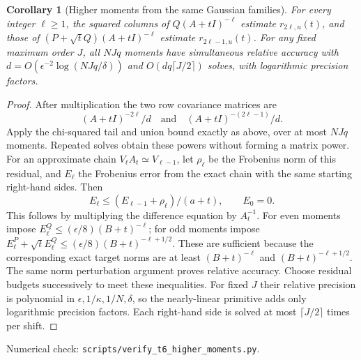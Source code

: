 \documentclass[11pt]{article}
\newtheorem{corollary}[theorem]{Corollary}
\begin{document}
\begin{corollary}[Higher moments from the same Gaussian families]\label{cor:higherjl}
For every integer $\ell\geq1$, the squared columns of
$Q(A+tI)^{-\ell}$ estimate $r_{2\ell,u}(t)$, and those of
$(P+\sqrt tQ)(A+tI)^{-\ell}$ estimate $r_{2\ell-1,u}(t)$.
For any fixed maximum order $J$, all $NJq$ moments have simultaneous
relative accuracy with $d=O(\epsilon^{-2}\log(NJq/\delta))$ and
$O(dq\lceil J/2\rceil)$ solves, with logarithmic precision factors.
\end{corollary}
\begin{proof}
After multiplication the two row covariance matrices are
\[
 (A+tI)^{-2\ell}/d\quad\text{and}\quad(A+tI)^{-(2\ell-1)}/d.
\]
Apply the chi-squared tail and union bound exactly as above, over
at most $NJq$ moments. Repeated solves obtain these powers without
forming a matrix power. For an approximate chain
$V_\ell A_t\simeq V_{\ell-1}$, let $\rho_\ell$ be the Frobenius
norm of this residual, and $E_\ell$ the Frobenius error from the
exact chain with the same starting right-hand sides. Then
\[
 E_\ell\leq(E_{\ell-1}+\rho_\ell)/(a+t),\qquad E_0=0.
\]
This follows by multiplying the difference equation by $A_t^{-1}$.
For even moments impose $E^Q_\ell\leq(\epsilon/8)(B+t)^{-\ell}$;
for odd moments impose
$E^P_\ell+\sqrt t E^Q_\ell
 \leq(\epsilon/8)(B+t)^{-\ell+1/2}$.
These are sufficient because the corresponding exact target norms
are at least $(B+t)^{-\ell}$ and $(B+t)^{-\ell+1/2}$.
The same norm perturbation argument proves relative accuracy.
Choose residual budgets successively to meet these inequalities.
For fixed $J$ their relative precision is polynomial in
$\epsilon,1/\kappa,1/N,\delta$, so the nearly-linear primitive
adds only logarithmic precision factors. Each right-hand side is
solved at most $\lceil J/2\rceil$ times per shift.
\end{proof}
\noindent Numerical check: \texttt{scripts/verify\_t6\_higher\_moments.py}.
\end{document}

